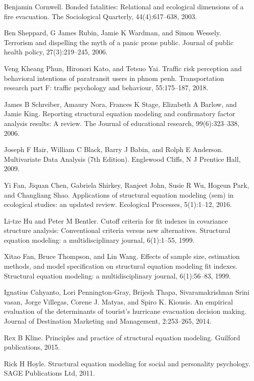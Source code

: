 \documentclass[letterpaper,12pt,titlepage,oneside,final,a4j,dvipdfmx]{book}
\begin{document}
\begin{thebibliography}{50}
  Benjamin Cornwell. Bonded fatalities: Relational and ecological dimensions of a fire evacuation. The Sociological Quarterly, 44(4):617–638, 2003.

 Ben Sheppard, G James Rubin, Jamie K Wardman, and Simon Wessely. Terrorism and dispelling the myth of a panic prone public. Journal of public health policy, 27(3):219–245, 2006.

  Veng Kheang Phun, Hironori Kato, and Tetsuo Yai. Traffic risk perception and behavioral intentions of paratransit users in phnom penh. Transportation research part F: traffic psychology and behaviour, 55:175–187, 2018.


  James B Schreiber, Amaury Nora, Frances K Stage, Elizabeth A Barlow, and Jamie King. Reporting structural equation modeling and confirmatory factor analysis results: A review. The Journal of educational research, 99(6):323–338, 2006.

 Joseph F Hair, William C Black, Barry J Babin, and Rolph E Anderson. Multivariate Data Analysis (7th Edition). Englewood Cliffs, N J Prentice Hall, 2009.


 Yi Fan, Jiquan Chen, Gabriela Shirkey, Ranjeet John, Susie R Wu, Hogeun Park, and Changliang Shao. Applications of structural equation modeling (sem) in ecological studies: an updated review. Ecological Processes, 5(1):1–12, 2016.

 Li-tze Hu and Peter M Bentler. Cutoff criteria for fit indexes in covariance structure analysis: Conventional criteria versus new alternatives. Structural equation modeling: a multidisciplinary journal, 6(1):1–55, 1999.

 Xitao Fan, Bruce Thompson, and Lin Wang. Effects of sample size, estimation methods, and model specification on structural equation modeling fit indexes. Structural equation modeling: a multidisciplinary journal, 6(1):56–83, 1999.

 Ignatius Cahyanto, Lori Pennington-Gray, Brijesh Thapa, Sivaramakrishnan Srini vasan, Jorge Villegas, Corene J. Matyas, and Spiro K. Kiousis. An empirical evaluation of the determinants of tourist's hurricane evacuation decision making. Journal of Destination Marketing and Management, 2:253–265, 2014.

 Rex B Kline. Principles and practice of structural equation modeling. Guilford publications, 2015.

 Rick H Hoyle. Structural equation modeling for social and personality psychology. SAGE Publications Ltd, 2011.


\end{thebibliography}
\end{document}

